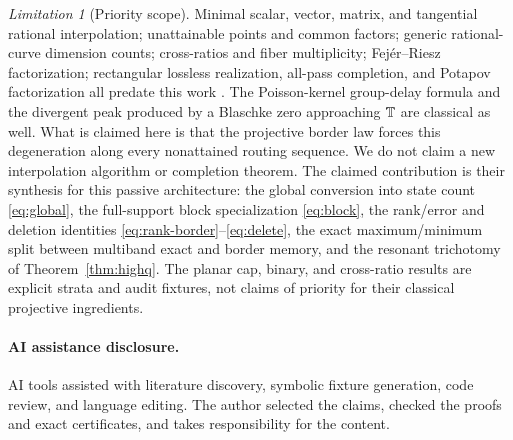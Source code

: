\documentclass[11pt]{article}
\theoremstyle{definition}\newtheorem{definition}[theorem]{Definition}\newtheorem{example}[theorem]{Example}
\theoremstyle{remark}\newtheorem{remark}[theorem]{Remark}\newtheorem{limitation}[theorem]{Limitation}
\begin{document}
\begin{limitation}[Priority scope]
Minimal scalar, vector, matrix, and tangential rational interpolation;
unattainable points and common factors; generic rational-curve dimension
counts; cross-ratios and fiber multiplicity; Fej\'er--Riesz factorization;
rectangular lossless realization, all-pass completion, and Potapov
factorization all predate this work
\cite{AntoulasEtAl1990,Ravi1997,BultheelVanBarel1990,Glader2008,
CortadellasUnattainable2018,BallKim1994,AlpayJorgensenLewkowicz2016}.
The Poisson-kernel group-delay formula and the divergent peak produced by a
Blaschke zero approaching $\mathbb T$ are classical as well.  What is claimed here is
that the projective border law forces this degeneration along every
nonattained routing sequence.
We do not claim a new interpolation algorithm or completion theorem.  The
claimed contribution is their synthesis for this passive architecture: the
global conversion into state count \eqref{eq:global}, the full-support block specialization
\eqref{eq:block}, the rank/error and deletion identities
\eqref{eq:rank-border}--\eqref{eq:delete}, the exact maximum/minimum split
between multiband exact and border memory, and the resonant trichotomy of
Theorem~\ref{thm:highq}.  The planar cap, binary, and cross-ratio results are
explicit strata and audit fixtures, not claims of priority for their classical
projective ingredients.
\end{limitation}

\paragraph{AI assistance disclosure.}
AI tools assisted with literature discovery, symbolic fixture generation,
code review, and language editing.  The author selected the claims, checked
the proofs and exact certificates, and takes responsibility for the content.
\end{document}
